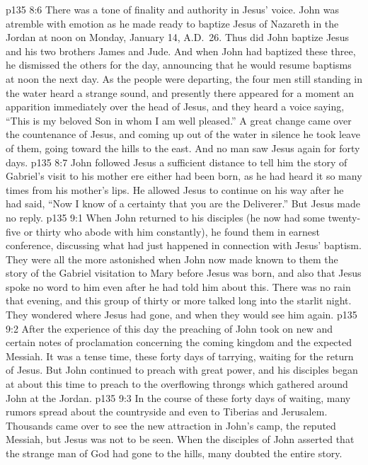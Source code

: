\pc \vs p135 8:6 There was a tone of finality and authority in Jesus’ voice. John was atremble with emotion as he made ready to baptize Jesus of Nazareth in the Jordan at noon on Monday, January 14, A.D.~26. Thus did John baptize Jesus and his two brothers James and Jude. And when John had baptized these three, he dismissed the others for the day, announcing that he would resume baptisms at noon the next day. As the people were departing, the four men still standing in the water heard a strange sound, and presently there appeared for a moment an apparition immediately over the head of Jesus, and they heard a voice saying, “This is my beloved Son in whom I am well pleased.” A great change came over the countenance of Jesus, and coming up out of the water in silence he took leave of them, going toward the hills to the east. And no man saw Jesus again for forty days.
\vs p135 8:7 John followed Jesus a sufficient distance to tell him the story of Gabriel’s visit to his mother ere either had been born, as he had heard it so many times from his mother’s lips. He allowed Jesus to continue on his way after he had said, “Now I know of a certainty that you are the Deliverer.” But Jesus made no reply.
\vs p135 9:1 When John returned to his disciples (he now had some twenty\hyp{}five or thirty who abode with him constantly), he found them in earnest conference, discussing what had just happened in connection with Jesus’ baptism. They were all the more astonished when John now made known to them the story of the Gabriel visitation to Mary before Jesus was born, and also that Jesus spoke no word to him even after he had told him about this. There was no rain that evening, and this group of thirty or more talked long into the starlit night. They wondered where Jesus had gone, and when they would see him again.
\pc \vs p135 9:2 After the experience of this day the preaching of John took on new and certain notes of proclamation concerning the coming kingdom and the expected Messiah. It was a tense time, these forty days of tarrying, waiting for the return of Jesus. But John continued to preach with great power, and his disciples began at about this time to preach to the overflowing throngs which gathered around John at the Jordan.
\vs p135 9:3 In the course of these forty days of waiting, many rumors spread about the countryside and even to Tiberias and Jerusalem. Thousands came over to see the new attraction in John’s camp, the reputed Messiah, but Jesus was not to be seen. When the disciples of John asserted that the strange man of God had gone to the hills, many doubted the entire story.
